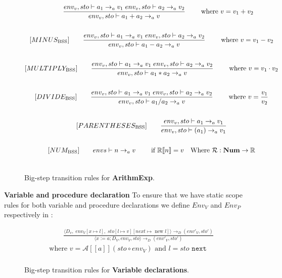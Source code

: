 \begin{figure}[htbp]
	\centering
	\begin{gather*}
		[PLUS_\text{BSS}] 
		\qquad \dfrac
		{\envs \vdash a_1 \rightarrow_a v_1 \; \envs \vdash a_2 \rightarrow_a v_2}
		{\envs \vdash a_1 + a_2 \rightarrow_a v}
		\qquad \text{ where }v = v_1 + v_2
		\\
		\\
		[MINUS_\text{BSS}] 
		\qquad \dfrac
		{\envs \vdash a_1 \rightarrow_a v_1 \; \envs \vdash a_2 \rightarrow_a v_2}
		{\envs \vdash a_1 - a_2 \rightarrow_a v}
		\qquad \text{ where }v = v_1 - v_2
		\\
		\\
		[MULTIPLY_\text{BSS}] 
		\qquad \dfrac
		{\envs \vdash a_1 \rightarrow_a v_1 \; \envs \vdash a_2 \rightarrow_a v_2}
		{\envs \vdash a_1 * a_2 \rightarrow_a v}
		\qquad \text{ where }v = v_1 \cdot v_2
		\\
		\\
		[DIVIDE_\text{BSS}] 
		\qquad \dfrac
		{\envs \vdash a_1 \rightarrow_a v_1 \; \envs \vdash a_2 \rightarrow_a v_2}
		{\envs \vdash a_1 / a_2 \rightarrow_a v}
		\qquad \text{ where }v = \dfrac{v_1}{v_2}
		\\
		\\
		[PARENTHESES_\text{BSS}] 
		\qquad \dfrac
		{\envs \vdash a_1 \rightarrow_a v_1}
		{\envs \vdash (a_1) \rightarrow_a v_1}
		\\
		\\
		[NUM_\text{BSS}] 
		\qquad envs \vdash n \rightarrow_a v
		\qquad \text{ if } \mathbb{R}[\![n]\!] = v \quad \text{Where } \mathcal{R}:\textbf{Num}\rightarrow \mathbb{R}
		\\
		\\
	\end{gather*}
	\caption{Big-step transition rules for \textbf{ArithmExp}.}
	\label{fig:BssArithm}
\end{figure}

\textbf{Variable and procedure declaration }
To ensure that we have static scope rules for both variable and procedure declarations we define $Env_V$ and $Env_P$ respectively in :



\begin{figure}[htbp]
	\centering
	\begin{gather*}
		[VAR_\text{BSS}]
		\qquad 
		\frac
		{\langle D_v,\; env_V[x \mapsto l], \; sto[l \mapsto v][next \mapsto \text{ new } l]\rangle \rightarrow_D (env'_V, sto')}
		{\langle x:=a; D_V, env_V, sto \rangle \rightarrow_D (env'_V, sto')} \\
		\text{where } v = \mathcal{A}[\![a]\!](sto\circ env_V ) \text{ and } l = \textit{sto } \texttt{next}
		\\
	\end{gather*}
	\caption{Big-step transition rules for \textbf{Variable declarations}.}
	\label{fig:BssStm}
\end{figure}

